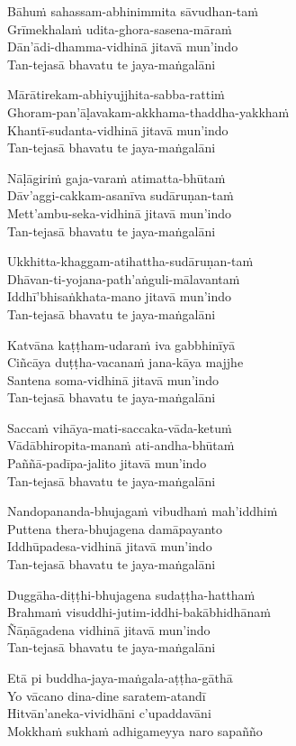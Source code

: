 \begin{paritta}
Bāhuṁ sahassam-abhinimmita sāvudhan-taṁ\\
Grīmekhalaṁ udita-ghora-sasena-māraṁ\\
Dān'ādi-dhamma-vidhinā jitavā mun'indo\\
Tan-tejasā bhavatu te jaya-maṅgalāni

Mārātirekam-abhiyujjhita-sabba-rattiṁ\\
Ghoram-pan'āḷavakam-akkhama-thaddha-yakkhaṁ\\
Khantī-sudanta-vidhinā jitavā mun'indo\\
Tan-tejasā bhavatu te jaya-maṅgalāni

Nāḷāgiriṁ gaja-varaṁ atimatta-bhūtaṁ\\
Dāv'aggi-cakkam-asanīva sudāruṇan-taṁ\\
Mett'ambu-seka-vidhinā jitavā mun'indo\\
Tan-tejasā bhavatu te jaya-maṅgalāni

Ukkhitta-khaggam-atihattha-sudāruṇan-taṁ\\
Dhāvan-ti-yojana-path'aṅguli-mālavantaṁ\\
Iddhī'bhisaṅkhata-mano jitavā mun'indo\\
Tan-tejasā bhavatu te jaya-maṅgalāni

Katvāna kaṭṭham-udaraṁ iva gabbhinīyā\\
Ciñcāya duṭṭha-vacanaṁ jana-kāya majjhe\\
Santena soma-vidhinā jitavā mun'indo\\
Tan-tejasā bhavatu te jaya-maṅgalāni

Saccaṁ vihāya-mati-saccaka-vāda-ketuṁ\\
Vādābhiropita-manaṁ ati-andha-bhūtaṁ\\
Paññā-padīpa-jalito jitavā mun'indo\\
Tan-tejasā bhavatu te jaya-maṅgalāni

Nandopananda-bhujagaṁ vibudhaṁ mah'iddhiṁ\\
Puttena thera-bhujagena damāpayanto\\
Iddhūpadesa-vidhinā jitavā mun'indo\\
Tan-tejasā bhavatu te jaya-maṅgalāni

Duggāha-diṭṭhi-bhujagena sudaṭṭha-hatthaṁ\\
Brahmaṁ visuddhi-jutim-iddhi-bakābhidhānaṁ\\
Ñāṇāgadena vidhinā jitavā mun'indo\\
Tan-tejasā bhavatu te jaya-maṅgalāni

Etā pi buddha-jaya-maṅgala-aṭṭha-gāthā\\
Yo vācano dina-dine saratem-atandī\\
Hitvān'aneka-vividhāni c'upaddavāni\\
Mokkhaṁ sukhaṁ adhigameyya naro sapañño
\end{paritta}


